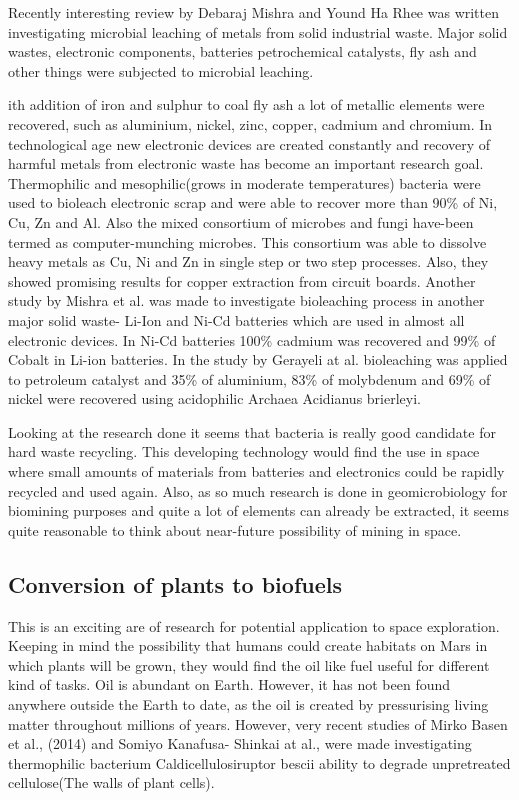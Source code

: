 \documentclass[12pt]{article}
\begin{document}
Recently interesting review by Debaraj Mishra and Yound Ha Rhee was written investigating microbial leaching of metals from solid industrial waste. Major solid wastes, electronic components, batteries petrochemical catalysts, fly ash and other things were subjected to microbial leaching.


ith addition of iron and sulphur to coal fly ash a lot of metallic elements were recovered, such as aluminium, nickel, zinc, copper, cadmium and chromium. In technological age new electronic devices are created constantly and recovery of harmful metals from electronic waste has become an important research goal. Thermophilic and mesophilic(grows in moderate temperatures) bacteria were used to bioleach electronic scrap and were able to recover more than 90\% of Ni, Cu, Zn and Al. Also the mixed consortium of microbes and fungi have-been
termed as computer-munching microbes. This consortium was able to dissolve heavy metals as Cu, Ni and Zn in single step or two step processes. Also, they showed promising results for copper extraction from circuit boards. Another study by Mishra et al.\cite{} was made to investigate bioleaching process in another major solid waste- Li-Ion and Ni-Cd batteries which are used in
almost all electronic devices. In Ni-Cd batteries 100\% cadmium was recovered and 99\% of Cobalt in Li-ion batteries. In the study by Gerayeli at al. bioleaching was applied to petroleum catalyst and 35\% of aluminium, 83\% of molybdenum and 69\% of nickel were recovered using acidophilic Archaea Acidianus brierleyi. 

Looking at the research done it seems that bacteria is really good candidate for hard waste recycling. This developing technology would find the use in space where small amounts of materials from batteries and electronics could be rapidly recycled and used again. Also, as so much research is done in geomicrobiology for biomining purposes and quite a lot of elements can already be extracted, it seems quite reasonable to think about near-future possibility of mining in space.

\subsection{Conversion of plants to biofuels}

This is an exciting are of research for potential application to space exploration. Keeping in mind the possibility that humans could create habitats on Mars in which plants will be grown, they would find the oil like fuel useful for different kind of tasks. Oil is abundant on Earth. However, it has not been found anywhere outside the Earth to date, as the oil is created by pressurising living matter throughout millions of years. However, very recent studies of Mirko Basen et al., (2014)  and Somiyo Kanafusa- Shinkai at al., were made investigating thermophilic
bacterium Caldicellulosiruptor bescii ability to degrade unpretreated cellulose(The walls of plant cells).
\end{document}
